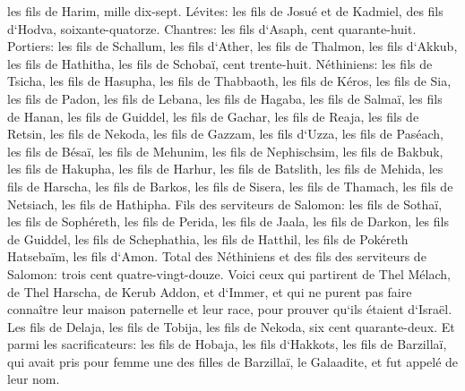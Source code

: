 \verse les fils de Harim, mille dix-sept. 
\verse Lévites: les fils de Josué et de Kadmiel, des fils d`Hodva, soixante-quatorze. 
\verse Chantres: les fils d`Asaph, cent quarante-huit. 
\verse Portiers: les fils de Schallum, les fils d`Ather, les fils de Thalmon, les fils d`Akkub, les fils de Hathitha, les fils de Schobaï, cent trente-huit. 
\verse Néthiniens: les fils de Tsicha, les fils de Hasupha, les fils de Thabbaoth, 
\verse les fils de Kéros, les fils de Sia, les fils de Padon, 
\verse les fils de Lebana, les fils de Hagaba, les fils de Salmaï, 
\verse les fils de Hanan, les fils de Guiddel, les fils de Gachar, 
\verse les fils de Reaja, les fils de Retsin, les fils de Nekoda, 
\verse les fils de Gazzam, les fils d`Uzza, les fils de Paséach, 
\verse les fils de Bésaï, les fils de Mehunim, les fils de Nephischsim, 
\verse les fils de Bakbuk, les fils de Hakupha, les fils de Harhur, 
\verse les fils de Batslith, les fils de Mehida, les fils de Harscha, 
\verse les fils de Barkos, les fils de Sisera, les fils de Thamach, 
\verse les fils de Netsiach, les fils de Hathipha. 
\verse Fils des serviteurs de Salomon: les fils de Sothaï, les fils de Sophéreth, les fils de Perida, 
\verse les fils de Jaala, les fils de Darkon, les fils de Guiddel, 
\verse les fils de Schephathia, les fils de Hatthil, les fils de Pokéreth Hatsebaïm, les fils d`Amon. 
\verse Total des Néthiniens et des fils des serviteurs de Salomon: trois cent quatre-vingt-douze. 
\verse Voici ceux qui partirent de Thel Mélach, de Thel Harscha, de Kerub Addon, et d`Immer, et qui ne purent pas faire connaître leur maison paternelle et leur race, pour prouver qu`ils étaient d`Israël. 
\verse Les fils de Delaja, les fils de Tobija, les fils de Nekoda, six cent quarante-deux. 
\verse Et parmi les sacrificateurs: les fils de Hobaja, les fils d`Hakkots, les fils de Barzillaï, qui avait pris pour femme une des filles de Barzillaï, le Galaadite, et fut appelé de leur nom. 
